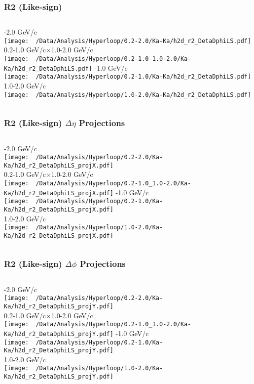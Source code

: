 \documentclass{beamer}
\begin{document}
\begin{frame}
	\frametitle{R2 (Like-sign)}
	\begin{columns}
		-2.0 GeV/c\\
		\texttt{[image: ~/Data/Analysis/Hyperloop/0.2-2.0/Ka-Ka/h2d\_r2\_DetaDphiLS.pdf]}\\0.2-1.0 GeV/c$\times$1.0-2.0 GeV/c\\
		\texttt{[image: ~/Data/Analysis/Hyperloop/0.2-1.0\_1.0-2.0/Ka-Ka/h2d\_r2\_DetaDphiLS.pdf]}
		-1.0 GeV/c\\
		\texttt{[image: ~/Data/Analysis/Hyperloop/0.2-1.0/Ka-Ka/h2d\_r2\_DetaDphiLS.pdf]}\\1.0-2.0 GeV/c\\
		\texttt{[image: ~/Data/Analysis/Hyperloop/1.0-2.0/Ka-Ka/h2d\_r2\_DetaDphiLS.pdf]}
	\end{columns}
\end{frame}
\begin{frame}
	\frametitle{R2 (Like-sign) $\Delta\eta$ Projections}
	\begin{columns}
		\column{0.5\textwidth}
		-2.0 GeV/c\\
		\texttt{[image: ~/Data/Analysis/Hyperloop/0.2-2.0/Ka-Ka/h2d\_r2\_DetaDphiLS\_projX.pdf]}\\0.2-1.0 GeV/c$\times$1.0-2.0 GeV/c\\
		\texttt{[image: ~/Data/Analysis/Hyperloop/0.2-1.0\_1.0-2.0/Ka-Ka/h2d\_r2\_DetaDphiLS\_projX.pdf]}
		\column{0.5\textwidth}
		-1.0 GeV/c\\
		\texttt{[image: ~/Data/Analysis/Hyperloop/0.2-1.0/Ka-Ka/h2d\_r2\_DetaDphiLS\_projX.pdf]}\\1.0-2.0 GeV/c\\
		\texttt{[image: ~/Data/Analysis/Hyperloop/1.0-2.0/Ka-Ka/h2d\_r2\_DetaDphiLS\_projX.pdf]}
	\end{columns}
\end{frame}
\begin{frame}
	\frametitle{R2 (Like-sign) $\Delta\phi$ Projections}
	\begin{columns}
		-2.0 GeV/c\\
		\texttt{[image: ~/Data/Analysis/Hyperloop/0.2-2.0/Ka-Ka/h2d\_r2\_DetaDphiLS\_projY.pdf]}\\0.2-1.0 GeV/c$\times$1.0-2.0 GeV/c\\
		\texttt{[image: ~/Data/Analysis/Hyperloop/0.2-1.0\_1.0-2.0/Ka-Ka/h2d\_r2\_DetaDphiLS\_projY.pdf]}
		-1.0 GeV/c\\
		\texttt{[image: ~/Data/Analysis/Hyperloop/0.2-1.0/Ka-Ka/h2d\_r2\_DetaDphiLS\_projY.pdf]}\\1.0-2.0 GeV/c\\
		\texttt{[image: ~/Data/Analysis/Hyperloop/1.0-2.0/Ka-Ka/h2d\_r2\_DetaDphiLS\_projY.pdf]}
	\end{columns}
\end{frame}
\end{document}
